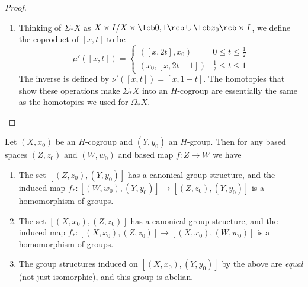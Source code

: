 \begin{proof}
\begin{enumerate}
	\item Thinking of $\Sigma_* X$ as $X \times I / X \times \lcb 0,1 \rcb \cup \lcb x_0 \rcb \times I$, we define the coproduct of $[x,t]$ to be
	\[ \mu'([x,t]) = \begin{cases} ([x,2t],x_0) & 0 \leq t \leq \frac{1}{2} \\ (x_0,[x,2t-1]) & \frac{1}{2} \leq t \leq 1 \end{cases} \]
	The inverse is defined by $\nu'([x,t]) = [x,1-t]$. The homotopies that show these operations make $\Sigma_* X$ into an $H$-cogroup are essentially the same as the homotopies we used for $\Omega_* X$.
	
\end{enumerate}
\end{proof}


\begin{prop}
Let $(X,x_0)$ be an $H$-cogroup and $(Y,y_0)$ an $H$-group. Then for any based spaces $(Z,z_0)$ and $(W,w_0)$ and based map $f : Z \rightarrow W$ we have
\begin{enumerate}
	\item The set $[(Z,z_0),(Y,y_0)]$ has a canonical group structure, and the induced map $f_* : [(W,w_0),(Y,y_0)] \rightarrow [(Z,z_0),(Y,y_0)]$ is a homomorphism of groups.
	\item The set $[(X,x_0),(Z,z_0)]$ has a canonical group structure, and the induced map $f_* : [(X,x_0),(Z,z_0)] \rightarrow [(X,x_0),(W,w_0)]$ is a homomorphism of groups.
	\item The group structures induced on $[(X,x_0),(Y,y_0)]$ by the above are \emph{equal} (not just isomorphic), and this group is abelian.
\end{enumerate}
\end{prop}
